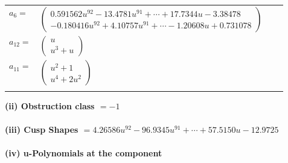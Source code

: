 \documentclass[1p]{elsarticle_modified}
\theoremstyle{definition}
\begin{document}
\begin{tabular}{m{7pt} m{180pt} m{7pt} m{180pt} }
\flushright $a_{6}=$&$\begin{pmatrix}0.591562 u^{92}-13.4781 u^{91}+\cdots+17.7344 u-3.38478\\-0.180416 u^{92}+4.10757 u^{91}+\cdots-1.20608 u+0.731078\end{pmatrix}$ \\
\flushright $a_{12}=$&$\begin{pmatrix}u\\u^3+u\end{pmatrix}$ \\
\flushright $a_{11}=$&$\begin{pmatrix}u^2+1\\u^4+2 u^2\end{pmatrix}$\\&\end{tabular}
\flushleft \textbf{(ii) Obstruction class $= -1$}\\~\\
\flushleft \textbf{(iii) Cusp Shapes $= 4.26586 u^{92}-96.9345 u^{91}+\cdots+57.5150 u-12.9725$}\\~\\
\newpage\renewcommand{\arraystretch}{1}
\flushleft \textbf{(iv) u-Polynomials at the component}\newline \\
\end{document}
